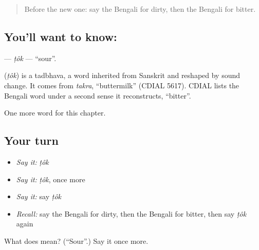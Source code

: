\label{lesson:BN-C75-tok}



\begin{quote}
Before the new one: say the Bengali for dirty, then the Bengali for bitter.
\end{quote}

\subsection*{You'll want to know: }
\textbf{} — \emph{ṭôk} — \textquotedblleft{}sour\textquotedblright{}.

\begin{cousinweb}
\textbf{} (\emph{ṭôk}) is a tadbhava, a word inherited from Sanskrit and reshaped by sound change. It comes from \emph{takra}, \textquotedblleft{}buttermilk\textquotedblright{} (CDIAL 5617). CDIAL lists the Bengali word under a second sense it reconstructs, \textquotedblleft{}bitter\textquotedblright{}.
\end{cousinweb}

\begin{grammarlens}[title={What you've built}]
One more word for this chapter.
\end{grammarlens}

\subsection*{Your turn}
\begin{itemize}
\raggedright
  \item \emph{Say it:} \emph{ṭôk}
  \item \emph{Say it:} \emph{ṭôk}, once more
  \item \emph{Say it:} say \emph{ṭôk}
  \item \emph{Recall:} say the Bengali for dirty, then the Bengali for bitter, then say \emph{ṭôk} again
\end{itemize}

\begin{tcolorbox}[breakable,colback=teal!4,colframe=teal!35!black,title={Before you move on}]
What does  mean? (\textquotedblleft{}Sour\textquotedblright{}.) Say it once more.
\end{tcolorbox}
